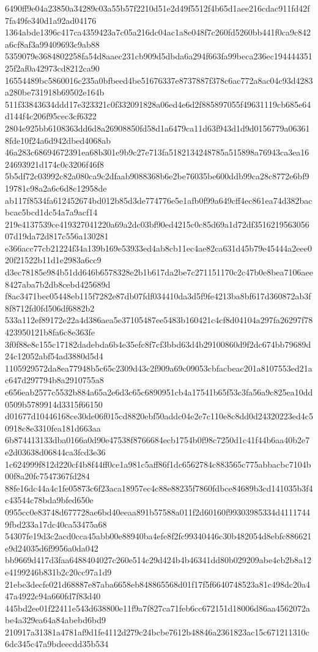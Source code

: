 {6490ff9e04a23850a34289c03a55b57f2210d51e2d49f5512f4b65d1aee216cdac911fd42f7fa49fe340d1a92ad04176
1364abde1396c417ca4359423a7c05a216dc04ac1a8e048f7c260fd5260bb441f0ca9c842a6cf8af3a99409693c9ab88
5359079e3684802258fa54d8aaec231cb909d5dbda6a294f663fa99beca236ec19444435125f2af0a42973cd8212ca90
16554489bc5860016c235a0bfbeed4be51676337e8737887f378c6ac772a8ac04c93d4283a280be731918b69502e164b
511f33843634ddd17e323321c0f332091828a06ed4e6d2f885897055f49631119cb685e64d144f4c206f95cec3cf6322
2804e925bb6108363dd6d8a26908850fd58d1a6479ca11d63f943d1d9d0156779a063618fde10f24a6d942dbed4068ab
46a283c68694672391ea68b301e9b9c27e713fa5182134248785a515898a76943ca3ea1624693921d174c0c3206f46f8
5b5df72c03992c82a080ca9c2dfaab9088368b6e2be76035be600ddb99ca28c8772e6bf919781c98a2a6c6d8c12958de
ab117f8534fa612452674bd012b85d3de774776e5e1afb0f99a649cff4ec861ea74d382bacbcac5bcd1dc54a7a9acf14
219e4137539ce419327041220a69a2dc03bf90ed4215c0c85d69a1d72df351621956305607d19da72d817c556a130281
e366acc77cb21224f34a139b169e53933ed4ab8cb11ec4ae82ca631d45b79e45444a2eee020f21522b11d1e2983a6cc9
d3ec78185e984b51dd646b6578328e2b1b617da2be7c271151170c2c47b0e8bea7106aee8427aba7b2db8cebd425689d
f8ac3471bec05448eb115f7282e87db07fdf034410da3d5f9fe4213ba8bf617d360872ab3f8f8712fd0fd506df6882b2
533a112ef89172e22a4d386aea5e37105487ee5483b160421c4cf8d04104a297fa26297f78423950121b8fa6c8e363fe
3f0f88e8c155c17182dadebda6b4e35efc8f7cf3bbd63d4b29100860d9f2dc674bb79689d24c12052abf54ad3880d5d4
1105929572da8ea77948b5c65c2309d43c2f909a69c09053cbfacbeac201a8107553ed21ac647d297794b8a2910755a8
e656eab2577c5532b884a65a2e6d3c65c6890951cb4a17541b65f53c3fa56a9c825ea10dd0509b5789914d3315f66150
d01677d10446168ce30de06f015cd8820ebf50addc04e2e7c110e8c8dd0d24320223ed4c50918c8e3310fea181d663aa
6b874413133dba0166a0d90e47538f8766684ecb1754b0f98c7250d1c41f44b6aa40b2e7e2d03638d06844ca3fcd3e36
1c624999f812d220cf4b8f44ff0ce1a981c5aff86f1dc6562784c883565c775abbacbc7104b00f8a20fc7547367fd284
88fe16dc44a4c1fe05873c6f23aca18957ec4c88e88235f7860fdbce84689b3cd141035b3f4c43544c78bda9bfed650e
0955cc0e83748d677728ae6bd40eeaa891b57588a011f2d60160f99303985334d41117449fbd233a17dc40ca53475a68
54307fe19d3c2acd0cca45abb00e88940ba4efe8f2fc99340446c30b482054d8ebfc886621e9d24035d6f9956a0da042
bb9669d417d3faa6488404027c260e514c29d424b4b46341dd80b029209abe4cb2b8a12e4199246b831b2c20cc97a1d9
21ebe3decfe021d68887e87aba6658eb848865568d01f17f5f6640748523a81c498dc20a447a4922c94a660fd7f83d40
445bd2ee01f22411e543d638800e11f9a7f827ca71feb6cc672151d18006d86aa4562072abe4a329ea64a84abebd6bd9
210917a31381a4781af9d1fe4112d279c24bcbe7612b48846a2361823ac15c671211310c6dc345c47a9bdeecdd35b534
}
